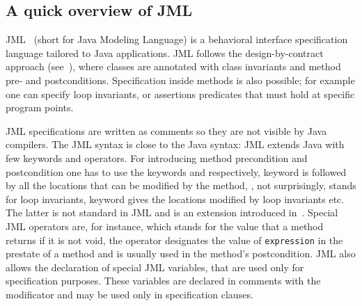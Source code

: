 


\subsection{A quick overview of JML} \label{BCSLprelim}
JML~\cite{JMLRefMan} (short for Java Modeling Language) is a behavioral interface specification language tailored to Java applications. JML 
follows the design-by-contract approach (see~\cite{M97oos}), where classes are annotated with class invariants and method pre- and postconditions. Specification
inside methods is also possible; for example one can specify loop invariants, or assertions  predicates that must hold at specific program points. 

JML specifications are written as comments so they are not visible by Java compilers. The JML syntax is close to the 
 Java syntax: JML extends Java with few keywords and operators.
 For introducing method precondition and postcondition one has to use the keywords  and  
  respectively,   keyword is followed by all the locations that can be modified by the method, 
  , not surprisingly, stands for loop invariants,  keyword gives the locations modified by loop invariants etc. 
  The latter is not standard in JML and is an extension introduced in~\cite{BRL-JACK}. Special JML operators are, for instance,  which stands for the value that a method returns if it is not void, the  operator 
  designates the value of \texttt{expression} in the prestate of a method and is usually used in the method's postcondition. 
  JML also allows the declaration of special JML variables, that are used only for specification purposes. 
These variables are declared in comments with the  modificator and may be used only in specification clauses. 

